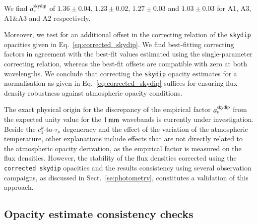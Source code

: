 \documentclass[traditionalabstract]{aa}
\newcommand{\taunu}{\tau_{\nu}}
\newcommand{\lp}[1]{#1}
\newcommand{\rev}[1]{#1}
\begin{document}
We find $a_\nu^{\rm{skydip}}$ of
$1.36 \pm 0.04$,
$1.23 \pm 0.02$,
$1.27 \pm 0.03$ and
$1.03 \pm 0.03$ for A1, A3, A1$\&$A3 and A2 respectively.

Moreover, we test for an additional offset in the
correcting relation of the {\tt skydip} opacities given in
Eq.~\ref{eq:corrected_skydip}. We find best-fitting correcting factors
in agreement with the best-fit values estimated using the single-parameter
correcting relation, whereas the best-fit offsets are compatible with
zero at both wavelengths. We conclude that correcting the {\tt skydip}
opacity estimates for a normalisation as given in
Eq.~\ref{eq:corrected_skydip} suffices for ensuring flux density
robustness against atmospheric opacity conditions.

The exact physical origin for the discrepancy of the empirical factor
$a_\nu^{\rm{skydip}}$ from the expected unity value {\lp for the
$1\,\rm{mm}$ wavebands} is currently under investigation.
{\rev Beside the $c_1^k$-to-$\taunu$ degeneracy and the effect
of the variation of the atmospheric temperature, other explanations
include effects that are not directly related to the atmospheric
opacity derivation, as the empirical factor is measured on the flux
densities.} 
However, the stability of the flux densities corrected using the
{\tt corrected skydip} opacities {\lp and the results consistency using
several observation campaigns}, as discussed in
Sect.~\ref{se:photometry}, constitutes a validation of this approach.


\subsection{Opacity estimate consistency checks}
\label{se:opacity_tests}
\end{document}
